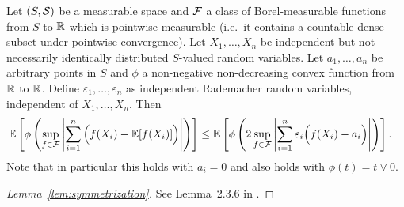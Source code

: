 \begin{lemma}
  \label{lem:symmetrization}

  Let $(S, \mathcal{S})$ be a measurable space and
  $\mathcal{F}$ a class of Borel-measurable functions
  from $S$ to $\mathbb{R}$ which is pointwise measurable
  (i.e.\ it contains a countable dense subset
  under pointwise convergence).
  Let $X_1, \ldots, X_n$
  be independent
  but not necessarily identically distributed
  $S$-valued random variables.
  Let $a_1, \ldots, a_n$ be arbitrary points in $S$
  and $\phi$ a non-negative non-decreasing convex function
  from $\mathbb{R}$ to $\mathbb{R}$.
  Define $\varepsilon_1, \ldots, \varepsilon_n$
  as independent Rademacher
  random variables,
  independent of $X_1, \ldots, X_n$.
  Then
  \begin{align*}
    \mathbb{E} \left[
      \phi \left(
        \sup_{f \in \mathcal{F}}
        \left|
        \sum_{i=1}^n
        \Big(
        f(X_i)
        - \mathbb{E}[f(X_i)]
        \Big)
        \right|
      \right)
    \right]
    &\leq
    \mathbb{E} \left[
      \phi \left(
        2
        \sup_{f \in \mathcal{F}}
        \left|
        \sum_{i=1}^n
        \varepsilon_i
        \Big(
        f(X_i)
        - a_i
        \Big)
        \right|
      \right)
    \right].
  \end{align*}
  Note that in particular this holds with $a_i = 0$
  and also holds with $\phi(t) = t \vee 0$.

\end{lemma}

\begin{proof}[Lemma~\ref{lem:symmetrization}]

  See Lemma~2.3.6 in
  \citet{van1996weak}.
\end{proof}


